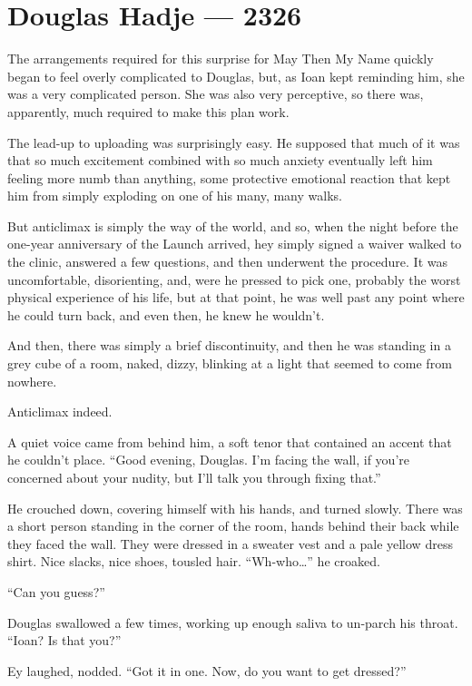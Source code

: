 \hypertarget{douglas-hadje-2326}{%
\chapter{Douglas Hadje — 2326}\label{douglas-hadje-2326}}

The arrangements required for this surprise for May Then My Name quickly began to feel overly complicated to Douglas, but, as Ioan kept reminding him, she was a very complicated person. She was also very perceptive, so there was, apparently, much required to make this plan work.

The lead-up to uploading was surprisingly easy. He supposed that much of it was that so much excitement combined with so much anxiety eventually left him feeling more numb than anything, some protective emotional reaction that kept him from simply exploding on one of his many, many walks.

But anticlimax is simply the way of the world, and so, when the night before the one-year anniversary of the Launch arrived, hey simply signed a waiver walked to the clinic, answered a few questions, and then underwent the procedure. It was uncomfortable, disorienting, and, were he pressed to pick one, probably the worst physical experience of his life, but at that point, he was well past any point where he could turn back, and even then, he knew he wouldn't.

And then, there was simply a brief discontinuity, and then he was standing in a grey cube of a room, naked, dizzy, blinking at a light that seemed to come from nowhere.

Anticlimax indeed.

A quiet voice came from behind him, a soft tenor that contained an accent that he couldn't place. ``Good evening, Douglas. I'm facing the wall, if you're concerned about your nudity, but I'll talk you through fixing that.''

He crouched down, covering himself with his hands, and turned slowly. There was a short person standing in the corner of the room, hands behind their back while they faced the wall. They were dressed in a sweater vest and a pale yellow dress shirt. Nice slacks, nice shoes, tousled hair. ``Wh-who\ldots{}'' he croaked.

``Can you guess?''

Douglas swallowed a few times, working up enough saliva to un-parch his throat. ``Ioan? Is that you?''

Ey laughed, nodded. ``Got it in one. Now, do you want to get dressed?''

